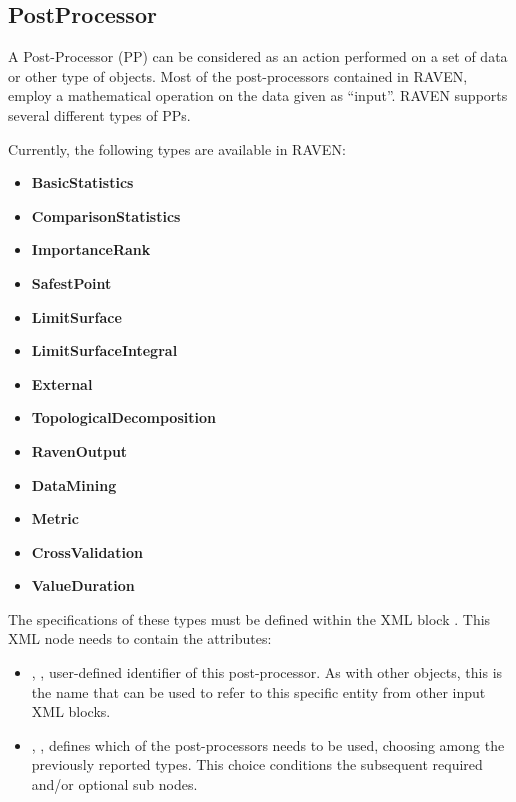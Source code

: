 \subsection{PostProcessor}
\label{sec:models_postProcessor}
A Post-Processor (PP) can be considered as an action performed on a set of data
or other type of objects.
%
Most of the post-processors contained in RAVEN, employ a mathematical operation
on the data given as ``input''.
%
RAVEN supports several different types of PPs.

Currently, the following types are available in RAVEN:
\begin{itemize}
  \itemsep0em
  \item \textbf{BasicStatistics}
  \item \textbf{ComparisonStatistics}
  \item \textbf{ImportanceRank}
  \item \textbf{SafestPoint}
  \item \textbf{LimitSurface}
  \item \textbf{LimitSurfaceIntegral}
  \item \textbf{External}
  \item \textbf{TopologicalDecomposition}
  \item \textbf{RavenOutput}
  \item \textbf{DataMining}
  \item \textbf{Metric}
  \item \textbf{CrossValidation}
  \item \textbf{ValueDuration}
\end{itemize}

The specifications of these types must be defined within the XML block
.
%
This XML node needs to contain the attributes:
\vspace{-5mm}
\begin{itemize}
  \itemsep0em
  \item {}, , user-defined
  identifier of this post-processor.
  \nb As with other objects, this is the name that can be used to refer to this
  specific entity from other input XML blocks.
  \item {}, , defines which of
  the post-processors needs to be used, choosing among the previously reported
  types.
  This choice conditions the subsequent required and/or optional
   sub nodes.
\end{itemize}
\vspace{-5mm}

